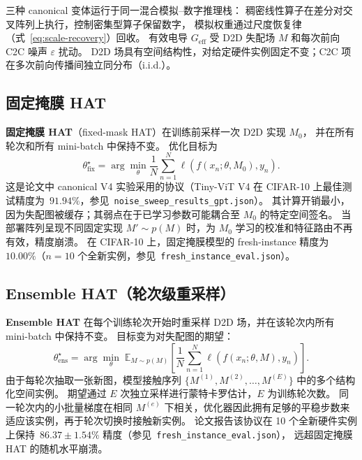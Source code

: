 三种 canonical 变体运行于同一混合模拟--数字推理栈：
稠密线性算子在差分对交叉阵列上执行，控制密集型算子保留数字，
模拟权重通过尺度恢复律（式~\ref{eq:scale-recovery}）回收。
有效电导 $G_{\mathrm{eff}}$ 受 D2D 失配场 $M$ 和每次前向 C2C 噪声 $\varepsilon$ 扰动。
D2D 场具有空间结构性，对给定硬件实例固定不变；C2C 项在多次前向传播间独立同分布（i.i.d.）。

\subsection{固定掩膜 HAT}

\textbf{固定掩膜 HAT}（fixed-mask HAT）在训练前采样一次 D2D 实现 $M_{0}$，
并在所有轮次和所有 mini-batch 中保持不变。
优化目标为
\begin{equation}
    \theta_{\mathrm{fix}}^{\star}=\arg\min_{\theta}\frac{1}{N}\sum_{n=1}^{N}\ell\!\left(f(x_{n};\theta,M_{0}),y_{n}\right).
\label{eq:hat-fixed}
\end{equation}
这是论文中 canonical V4 实验采用的协议（Tiny-ViT V4 在 CIFAR-10 上最佳测试精度为~$91.94\%$，参见~\texttt{noise\_sweep\_results\_gpt.json}）。
其计算开销最小，因为失配图被缓存；其弱点在于已学习参数可能耦合至 $M_{0}$ 的特定空间签名。
当部署阵列呈现不同固定实现 $M'\sim p(M)$ 时，为 $M_{0}$ 学习的校准和特征路由不再有效，精度崩溃。
在 CIFAR-10 上，固定掩膜模型的 fresh-instance 精度为~$10.00\%$（$n=10$ 个全新实例，参见~\texttt{fresh\_instance\_eval.json}）。

\subsection{Ensemble HAT（轮次级重采样）}

\textbf{Ensemble HAT} 在每个训练轮次开始时重采样 D2D 场，并在该轮次内所有 mini-batch 中保持不变。
目标变为对失配图的期望：
\begin{equation}
    \theta_{\mathrm{ens}}^{\star}=\arg\min_{\theta}\;\mathbb{E}_{M\sim p(M)}\!\left[\frac{1}{N}\sum_{n=1}^{N}\ell\!\left(f(x_{n};\theta,M),y_{n}\right)\right].
\label{eq:hat-ensemble}
\end{equation}
由于每轮次抽取一张新图，模型接触序列 $\{M^{(1)},M^{(2)},\dots,M^{(E)}\}$ 中的多个结构化空间实例。
期望通过 $E$ 次独立采样进行蒙特卡罗估计，$E$ 为训练轮次数。
同一轮次内的小批量梯度在相同 $M^{(e)}$ 下相关，优化器因此拥有足够的平稳步数来适应该实例，再于轮次切换时接触新实例。
论文报告该协议在 10 个全新硬件实例上保持~$86.37\pm1.54\%$ 精度（参见~\texttt{fresh\_instance\_eval.json}），
远超固定掩膜 HAT 的随机水平崩溃。

